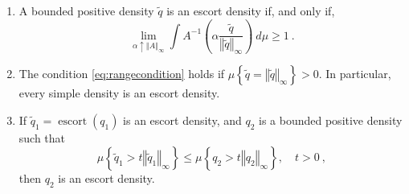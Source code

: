 \documentclass[graybox]{svmult}
\newcommand{\escortof}[1]{\operatorname{escort}\left(#1\right)}
\newcommand{\normat}[2]{\left\Vert#2\right\Vert_{#1}}
\newcommand{\set}[1]{\left\{#1\right\}}
\begin{document}
\begin{proposition}
  \label{prop:XCM}
  \begin{enumerate}
    \item\label{item:XCM1}
A bounded positive density $\widetilde q$ is an escort density if, and only if,
\begin{equation}\label{eq:rangecondition}
 \lim_{\alpha \uparrow \normat \infty {A}} \int A^{-1}\left(\alpha \frac{\widetilde q}{\normat \infty {\widetilde q}}\right)\ d\mu \ge 1 \ .
\end{equation}
\item \label{item:XCM2}
The condition \eqref{eq:rangecondition} holds if $\mu\set{\widetilde q = \normat \infty {\widetilde q}} > 0$. In particular, every simple density is an escort density.
\item\label{item:XCM3} If $\widetilde q_1 = \escortof {q_1}$ is an escort density, and $q_2$ is a bounded positive density such that
  \begin{equation*}
    \mu\set{\widetilde q_1 > t \normat \infty {\widetilde q_1}} \leq \mu\set{q_2 > t \normat \infty {q_2}}, \quad t > 0 \ , 
  \end{equation*}
then $q_2$ is an escort density.
\end{enumerate}
\end{proposition}
%
\end{document}
